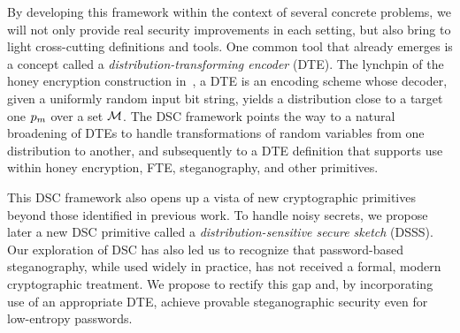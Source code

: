 {{By developing this framework within the context of several concrete problems,
we will not only provide real security improvements in each setting, but also
bring to light cross-cutting definitions and tools. One common tool that
already emerges is a concept called a {\em distribution-transforming encoder}
(DTE). The lynchpin of the honey encryption construction
in~\cite{HoneyEnc-EC:2014}, a DTE is an encoding scheme whose decoder, given a
uniformly random input bit string, yields a distribution close to a target one
$p_m$ over a set ${\cal{M}}$. The DSC framework points the way to a natural
broadening of DTEs to handle transformations of random variables from one
distribution to another, and subsequently to a DTE definition that supports
use within honey encryption, FTE, steganography, and other primitives. 

This DSC framework also opens up a vista of new cryptographic primitives beyond
those identified in previous work. To handle noisy secrets, we propose later a
new DSC primitive called a {\em distribution-sensitive secure sketch} (DSSS).
Our exploration of DSC has also led us to recognize that password-based
steganography, while used widely in practice, has not received a formal, modern
cryptographic treatment. We propose to rectify this gap and, by incorporating use of an
appropriate DTE, achieve provable steganographic security even for low-entropy
passwords.  




}}
